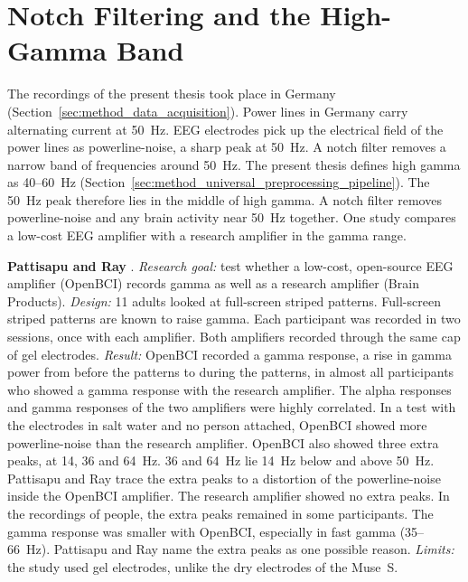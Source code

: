 \documentclass[12pt,a4paper]{report}
\begin{document}
\section{Notch Filtering and the High-Gamma Band}
\label{sec:lit_notch_high_gamma}
The recordings of the present thesis took place in Germany (Section~\ref{sec:method_data_acquisition}). Power lines in Germany carry alternating current at 50~Hz. EEG electrodes pick up the electrical field of the power lines as powerline-noise, a sharp peak at 50~Hz. A notch filter removes a narrow band of frequencies around 50~Hz. The present thesis defines high gamma as 40--60~Hz (Section~\ref{sec:method_universal_preprocessing_pipeline}). The 50~Hz peak therefore lies in the middle of high gamma. A notch filter removes powerline-noise and any brain activity near 50~Hz together. One study compares a low-cost EEG amplifier with a research amplifier in the gamma range.

\textbf{Pattisapu and Ray} \cite{pattisapu_stimulus-induced_2023}. \emph{Research goal:} test whether a low-cost, open-source EEG amplifier (OpenBCI) records gamma as well as a research amplifier (Brain Products). \emph{Design:} 11 adults looked at full-screen striped patterns. Full-screen striped patterns are known to raise gamma. Each participant was recorded in two sessions, once with each amplifier. Both amplifiers recorded through the same cap of gel electrodes. \emph{Result:} OpenBCI recorded a gamma response, a rise in gamma power from before the patterns to during the patterns, in almost all participants who showed a gamma response with the research amplifier. The alpha responses and gamma responses of the two amplifiers were highly correlated. In a test with the electrodes in salt water and no person attached, OpenBCI showed more powerline-noise than the research amplifier. OpenBCI also showed three extra peaks, at 14, 36 and 64~Hz. 36 and 64~Hz lie 14~Hz below and above 50~Hz. Pattisapu and Ray trace the extra peaks to a distortion of the powerline-noise inside the OpenBCI amplifier. The research amplifier showed no extra peaks. In the recordings of people, the extra peaks remained in some participants. The gamma response was smaller with OpenBCI, especially in fast gamma (35--66~Hz). Pattisapu and Ray name the extra peaks as one possible reason. \emph{Limits:} the study used gel electrodes, unlike the dry electrodes of the Muse~S.
\end{document}

